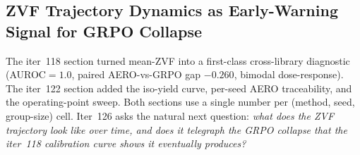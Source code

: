 
\subsection{ZVF Trajectory Dynamics as Early-Warning Signal for GRPO Collapse}
\label{sec:zvf-ews}

The iter~118 section turned mean-ZVF into a first-class
cross-library diagnostic (AUROC$=1.0$, paired AERO-vs-GRPO gap
$-0.260$, bimodal dose-response). The iter~122 section added
the iso-yield curve, per-seed AERO traceability, and the
operating-point sweep. Both sections use a single number per
(method, seed, group-size) cell. Iter~126 asks the natural
next question: \emph{what does the ZVF trajectory look like
\emph{over time}, and does it telegraph the GRPO collapse
that the iter~118 calibration curve shows it eventually
produces?}

